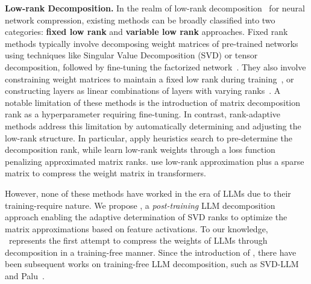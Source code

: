 \noindent\textbf{Low-rank Decomposition.}
In the realm of low-rank decomposition~\citep{schotthofer2022low} for neural network compression, existing methods can be broadly classified into two categories: \textbf{fixed low rank} and \textbf{variable low rank} approaches. Fixed rank methods typically involve decomposing weight matrices of pre-trained networks using techniques like Singular Value Decomposition (SVD) or tensor decomposition, followed by fine-tuning the factorized network~\citep{denton2014exploiting,lebedev2014speeding,sainath2013low,moczulski2015acdc}. They also involve constraining weight matrices to maintain a fixed low rank during training~\citep{jaderberg2014speeding,khodak2021initialization,wang2021pufferfish}, or constructing layers as linear combinations of layers with varying ranks~\citep{ioannou2015training}. 
A notable limitation of these methods is the introduction of matrix decomposition rank as a hyperparameter requiring fine-tuning. In contrast, rank-adaptive methods address this limitation by automatically determining and adjusting the low-rank structure. In particular, \citet{kim2015compression,kim2019efficient} apply heuristics search to pre-determine the decomposition rank, while \citet{wen2017coordinating} learn low-rank weights through a loss function penalizing approximated matrix ranks. 
\citet{li2023losparse} use low-rank approximation plus a sparse matrix to compress the weight matrix in transformers. 

However, none of these methods have worked in the era of LLMs due to their training-require nature. We propose \asvd, a \textit{post-training} LLM decomposition approach enabling the adaptive determination of SVD ranks to optimize the matrix approximations based on feature activations. 
To our knowledge, \asvd~represents the first attempt to compress the weights of LLMs through decomposition in a training-free manner. Since the introduction of \asvd, there have been subsequent works on training-free LLM decomposition, such as SVD-LLM \citep{wang2024svdllm} and Palu~\citep{chang2024palu}. 

